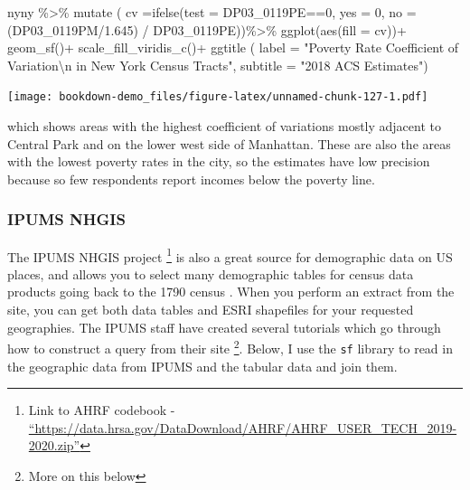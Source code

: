 \documentclass[
]{article}
\newenvironment{Shaded}{\begin{snugshade}}{\end{snugshade}}
\newcommand{\AttributeTok}[1]{\textcolor[rgb]{0.77,0.63,0.00}{#1}}
\newcommand{\DecValTok}[1]{\textcolor[rgb]{0.00,0.00,0.81}{#1}}
\newcommand{\FloatTok}[1]{\textcolor[rgb]{0.00,0.00,0.81}{#1}}
\newcommand{\FunctionTok}[1]{\textcolor[rgb]{0.00,0.00,0.00}{#1}}
\newcommand{\NormalTok}[1]{#1}
\newcommand{\SpecialCharTok}[1]{\textcolor[rgb]{0.00,0.00,0.00}{#1}}
\newcommand{\StringTok}[1]{\textcolor[rgb]{0.31,0.60,0.02}{#1}}
\begin{document}
\begin{Shaded}
\begin{Highlighting}[]
\NormalTok{nyny }\SpecialCharTok{\%\textgreater{}\%} 
  \FunctionTok{mutate}\NormalTok{ ( }\AttributeTok{cv =}\FunctionTok{ifelse}\NormalTok{(}\AttributeTok{test =}\NormalTok{ DP03\_0119PE}\SpecialCharTok{==}\DecValTok{0}\NormalTok{,}
                      \AttributeTok{yes =} \DecValTok{0}\NormalTok{,}
                      \AttributeTok{no =}\NormalTok{ (DP03\_0119PM}\SpecialCharTok{/}\FloatTok{1.645}\NormalTok{) }\SpecialCharTok{/}\NormalTok{ DP03\_0119PE))}\SpecialCharTok{\%\textgreater{}\%}
  \FunctionTok{ggplot}\NormalTok{(}\FunctionTok{aes}\NormalTok{(}\AttributeTok{fill =}\NormalTok{ cv))}\SpecialCharTok{+}
  \FunctionTok{geom\_sf}\NormalTok{()}\SpecialCharTok{+}
  \FunctionTok{scale\_fill\_viridis\_c}\NormalTok{()}\SpecialCharTok{+}
  \FunctionTok{ggtitle}\NormalTok{ ( }\AttributeTok{label =} \StringTok{"Poverty Rate Coefficient of Variation}\SpecialCharTok{\textbackslash{}n}\StringTok{ in New York Census Tracts"}\NormalTok{, }
            \AttributeTok{subtitle =} \StringTok{"2018 ACS Estimates"}\NormalTok{)}
\end{Highlighting}
\end{Shaded}

\texttt{[image: bookdown-demo\_files/figure-latex/unnamed-chunk-127-1.pdf]}

which shows areas with the highest coefficient of variations mostly adjacent to Central Park and on the lower west side of Manhattan. These are also the areas with the lowest poverty rates in the city, so the estimates have low precision because so few respondents report incomes below the poverty line.

\hypertarget{ipums-nhgis}{%
\subsubsection{IPUMS NHGIS}\label{ipums-nhgis}}

The IPUMS NHGIS project \footnote{Link to AHRF codebook - \href{https://data.hrsa.gov/DataDownload/AHRF/AHRF_USER_TECH_2019-2020.zip}{``https://data.hrsa.gov/DataDownload/AHRF/AHRF\_USER\_TECH\_2019-2020.zip''}} is also a great source for demographic data on US places, and allows you to select many demographic tables for census data products going back to the 1790 census \citep{nhgis}. When you perform an extract from the site, you can get both data tables and ESRI shapefiles for your requested geographies. The IPUMS staff have created several tutorials which go through how to construct a query from their site \footnote{More on this below}. Below, I use the \texttt{sf} library to read in the geographic data from IPUMS and the tabular data and join them.
\end{document}

